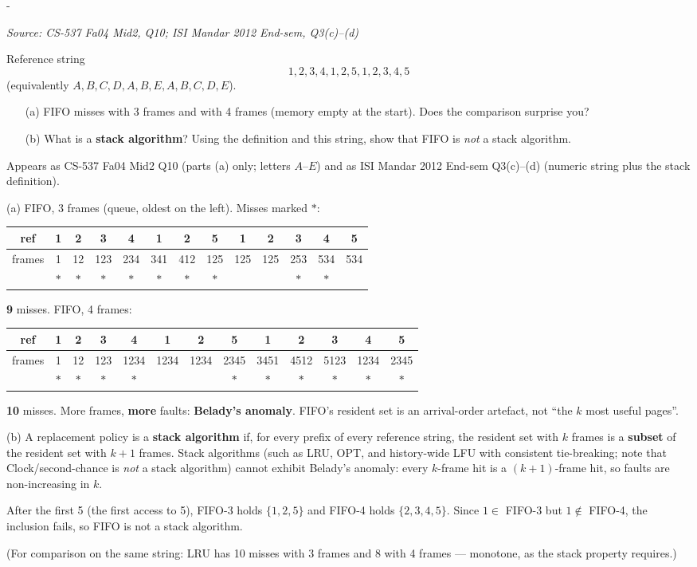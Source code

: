 \documentclass[11pt,a4paper]{article}
\makeatletter
\newcommand{\keepspace}[1]{\par\penalty-100\begingroup
  \setlength{\dimen@}{#1}\dimen@ii\pagegoal\advance\dimen@ii-\pagetotal
  \ifdim\dimen@>\dimen@ii\ifdim\dimen@ii>\z@\vfil\fi\break\fi\endgroup}
\newcounter{qn}[section]
\newenvironment{Qn}[4]{%
  \refstepcounter{qn}\keepspace{7\baselineskip}%
  \begin{tcolorbox}[qboxstyle, title={Q\thesection.\theqn\ \ [#1 \textbar\ #2]\ \ #4}]%
  {\footnotesize\color{g3}\textit{Source: #3}}\par\smallskip%
}{%
  \end{tcolorbox}%
}
\newenvironment{Sol}{%
  \begin{tcolorbox}[sboxstyle, title={Solution}]%
}{%
  \end{tcolorbox}\vspace{0.35em}%
}
\makeatother
\begin{document}
\begin{Qn}{Hard}{Lect 15}{CS-537 Fa04 Mid2, Q10; ISI Mandar 2012 End-sem, Q3(c)--(d)}{Belady's anomaly, and why FIFO is not a stack algorithm}
Reference string
\[
1,2,3,4,1,2,5,1,2,3,4,5
\]
(equivalently $A,B,C,D,A,B,E,A,B,C,D,E$).
\begin{enumerate}
  \item[(a)] FIFO misses with 3 frames and with 4 frames (memory empty at
        the start). Does the comparison surprise you?
  \item[(b)] What is a \textbf{stack algorithm}? Using the definition and
        this string, show that FIFO is \emph{not} a stack algorithm.
\end{enumerate}
Appears as CS-537 Fa04 Mid2 Q10 (parts (a) only; letters $A$--$E$) and
as ISI Mandar 2012 End-sem Q3(c)--(d) (numeric string plus the stack
definition).
\end{Qn}
\begin{Sol}
(a) FIFO, 3 frames (queue, oldest on the left). Misses marked $*$:
\begin{center}
\small
\begin{tabular}{c|cccccccccccc}
ref    & 1 & 2 & 3 & 4 & 1 & 2 & 5 & 1 & 2 & 3 & 4 & 5 \\
\hline
frames & 1 & 12& 123& 234& 341& 412& 125& 125& 125& 253& 534& 534 \\
       & $*$& $*$& $*$& $*$& $*$& $*$& $*$&   &   & $*$& $*$&     \\
\end{tabular}
\end{center}
\textbf{9} misses. FIFO, 4 frames:
\begin{center}
\small
\begin{tabular}{c|cccccccccccc}
ref    & 1 & 2 & 3 & 4 & 1 & 2 & 5 & 1 & 2 & 3 & 4 & 5 \\
\hline
frames & 1 & 12& 123&1234&1234&1234&2345&3451&4512&5123&1234&2345 \\
       & $*$& $*$& $*$& $*$&   &   & $*$& $*$& $*$& $*$& $*$& $*$ \\
\end{tabular}
\end{center}
\textbf{10} misses. More frames, \textbf{more} faults: \textbf{Belady's
anomaly}. FIFO's resident set is an arrival-order artefact, not ``the
$k$ most useful pages''.

(b) A replacement policy is a \textbf{stack algorithm} if, for every
prefix of every reference string, the resident set with $k$ frames is a
\textbf{subset} of the resident set with $k+1$ frames. Stack algorithms
(such as LRU, OPT, and history-wide LFU with consistent tie-breaking;
note that Clock/second-chance is \emph{not} a stack algorithm) cannot
exhibit Belady's anomaly: every $k$-frame hit is a $(k+1)$-frame hit, so
faults are non-increasing in $k$.

After the first 5 (the first access to 5), FIFO-3 holds $\{1,2,5\}$ and
FIFO-4 holds $\{2,3,4,5\}$. Since $1\in$ FIFO-3 but $1\notin$ FIFO-4, the
inclusion fails, so FIFO is not a stack algorithm.

(For comparison on the same string: LRU has 10 misses with 3 frames and
8 with 4 frames --- monotone, as the stack property requires.)
\end{Sol}
\end{document}
